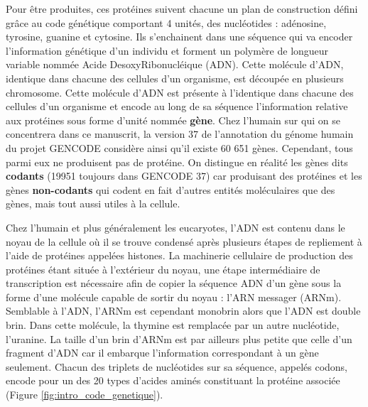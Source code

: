 Pour être produites, ces protéines suivent chacune un plan de construction défini grâce au code génétique comportant 4 unités, des nucléotides : adénosine, tyrosine, guanine et cytosine. Ils s'enchainent dans une séquence qui va encoder l'information génétique d'un individu et forment un polymère de longueur variable nommée Acide DesoxyRibonucléique (ADN). Cette molécule d'ADN, identique dans chacune des cellules d'un organisme, est découpée en plusieurs chromosome. Cette molécule d'ADN est présente à l'identique dans chacune des cellules d'un organisme et encode au long de sa séquence l'information relative aux protéines sous forme d'unité nommée \textbf{gène}. Chez l'humain sur qui on se concentrera dans ce manuscrit, la version 37 de l'annotation du génome humain du projet GENCODE \cite{Frankish2019Jan} considère ainsi qu'il existe 60 651 gènes. Cependant, tous parmi eux ne produisent pas de protéine. On distingue en réalité les gènes dits \textbf{codants} (19951 toujours dans GENCODE 37) car produisant des protéines et les gènes \textbf{non-codants} qui codent en fait d'autres entités moléculaires que des gènes, mais tout aussi utiles à la cellule.

Chez l'humain et plus généralement les eucaryotes, l'ADN est contenu dans le noyau de la cellule où il se trouve condensé après plusieurs étapes de repliement à l'aide de protéines appelées histones. La machinerie cellulaire de production des protéines étant située à l'extérieur du noyau, une étape intermédiaire de transcription est nécessaire afin de copier la séquence ADN d'un gène sous la forme d'une molécule capable de sortir du noyau : l'ARN messager (ARNm). Semblable à l'ADN, l'ARNm est cependant monobrin alors que l'ADN est double brin. Dans cette molécule, la thymine est remplacée par un autre nucléotide, l'uranine. La taille d'un brin d'ARNm est par ailleurs plus petite que celle d'un fragment d'ADN car il embarque l'information correspondant à un gène seulement. Chacun des triplets de nucléotides sur sa séquence, appelés codons, encode pour un des 20 types d'acides aminés constituant la protéine associée (Figure \ref{fig:intro_code_genetique}).

